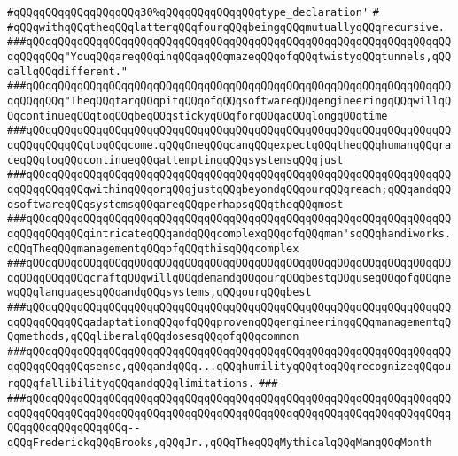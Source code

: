 \verb|#qQQqqQQqqQQqqQQqqQQq30%qQQqqQQqqQQqqQQqtype_declaration'|\newline
\verb|#|\newline
\verb|#qQQqwithqQQqtheqQQqlatterqQQqfourqQQqbeingqQQqmutuallyqQQqrecursive.|\newline
\newline
\newline
\newline
\verb|###qQQqqQQqqQQqqQQqqQQqqQQqqQQqqQQqqQQqqQQqqQQqqQQqqQQqqQQqqQQqqQQqqQQqqQQqqQQq"YouqQQqareqQQqinqQQqaqQQqmazeqQQqofqQQqtwistyqQQqtunnels,qQQqallqQQqdifferent."|\newline
\newline
\newline
\verb|###qQQqqQQqqQQqqQQqqQQqqQQqqQQqqQQqqQQqqQQqqQQqqQQqqQQqqQQqqQQqqQQqqQQqqQQqqQQq"TheqQQqtarqQQqpitqQQqofqQQqsoftwareqQQqengineeringqQQqwillqQQqcontinueqQQqtoqQQqbeqQQqstickyqQQqforqQQqaqQQqlongqQQqtime|\newline
\verb|###qQQqqQQqqQQqqQQqqQQqqQQqqQQqqQQqqQQqqQQqqQQqqQQqqQQqqQQqqQQqqQQqqQQqqQQqqQQqqQQqtoqQQqcome.qQQqOneqQQqcanqQQqexpectqQQqtheqQQqhumanqQQqraceqQQqtoqQQqcontinueqQQqattemptingqQQqsystemsqQQqjust|\newline
\verb|###qQQqqQQqqQQqqQQqqQQqqQQqqQQqqQQqqQQqqQQqqQQqqQQqqQQqqQQqqQQqqQQqqQQqqQQqqQQqqQQqwithinqQQqorqQQqjustqQQqbeyondqQQqourqQQqreach;qQQqandqQQqsoftwareqQQqsystemsqQQqareqQQqperhapsqQQqtheqQQqmost|\newline
\verb|###qQQqqQQqqQQqqQQqqQQqqQQqqQQqqQQqqQQqqQQqqQQqqQQqqQQqqQQqqQQqqQQqqQQqqQQqqQQqqQQqintricateqQQqandqQQqcomplexqQQqofqQQqman'sqQQqhandiworks.qQQqTheqQQqmanagementqQQqofqQQqthisqQQqcomplex|\newline
\verb|###qQQqqQQqqQQqqQQqqQQqqQQqqQQqqQQqqQQqqQQqqQQqqQQqqQQqqQQqqQQqqQQqqQQqqQQqqQQqqQQqcraftqQQqwillqQQqdemandqQQqourqQQqbestqQQquseqQQqofqQQqnewqQQqlanguagesqQQqandqQQqsystems,qQQqourqQQqbest|\newline
\verb|###qQQqqQQqqQQqqQQqqQQqqQQqqQQqqQQqqQQqqQQqqQQqqQQqqQQqqQQqqQQqqQQqqQQqqQQqqQQqqQQqadaptationqQQqofqQQqprovenqQQqengineeringqQQqmanagementqQQqmethods,qQQqliberalqQQqdosesqQQqofqQQqcommon|\newline
\verb|###qQQqqQQqqQQqqQQqqQQqqQQqqQQqqQQqqQQqqQQqqQQqqQQqqQQqqQQqqQQqqQQqqQQqqQQqqQQqqQQqsense,qQQqandqQQq...qQQqhumilityqQQqtoqQQqrecognizeqQQqourqQQqfallibilityqQQqandqQQqlimitations.|\newline
\verb|###|\newline
\verb|###qQQqqQQqqQQqqQQqqQQqqQQqqQQqqQQqqQQqqQQqqQQqqQQqqQQqqQQqqQQqqQQqqQQqqQQqqQQqqQQqqQQqqQQqqQQqqQQqqQQqqQQqqQQqqQQqqQQqqQQqqQQqqQQqqQQqqQQqqQQqqQQqqQQqqQQqqQQq--qQQqFrederickqQQqBrooks,qQQqJr.,qQQqTheqQQqMythicalqQQqManqQQqMonth|\newline
